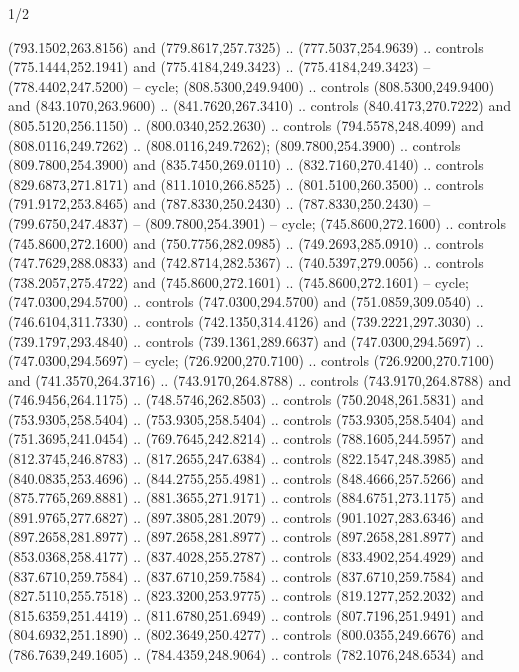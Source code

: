 \begin{flagdescription}{1/2}
\begin{scope}[xshift=0.5\flaglength,yshift=0.5\flagwidth,scale=\flagwidth/759]
\begin{scope}[y=0.8pt, x=0.8pt, yscale=-1,shift={(-720,-480)}]
\begin{scope}[draw=black,fill=c452c25,line width=0.438\lw]
  (793.1502,263.8156) and (779.8617,257.7325) .. (777.5037,254.9639) .. controls
  (775.1444,252.1941) and (775.4184,249.3423) .. (775.4184,249.3423) --
  (778.4402,247.5200) -- cycle;
 (808.5300,249.9400) .. controls (808.5300,249.9400) and
  (843.1070,263.9600) .. (841.7620,267.3410) .. controls (840.4173,270.7222) and
  (805.5120,256.1150) .. (800.0340,252.2630) .. controls (794.5578,248.4099) and
  (808.0116,249.7262) .. (808.0116,249.7262);
 (809.7800,254.3900) .. controls (809.7800,254.3900) and
  (835.7450,269.0110) .. (832.7160,270.4140) .. controls (829.6873,271.8171) and
  (811.1010,266.8525) .. (801.5100,260.3500) .. controls (791.9172,253.8465) and
  (787.8330,250.2430) .. (787.8330,250.2430) -- (799.6750,247.4837) --
  (809.7800,254.3901) -- cycle;
 (745.8600,272.1600) .. controls (745.8600,272.1600) and
  (750.7756,282.0985) .. (749.2693,285.0910) .. controls (747.7629,288.0833) and
  (742.8714,282.5367) .. (740.5397,279.0056) .. controls (738.2057,275.4722) and
  (745.8600,272.1601) .. (745.8600,272.1601) -- cycle;
 (747.0300,294.5700) .. controls (747.0300,294.5700) and
  (751.0859,309.0540) .. (746.6104,311.7330) .. controls (742.1350,314.4126) and
  (739.2221,297.3030) .. (739.1797,293.4840) .. controls (739.1361,289.6637) and
  (747.0300,294.5697) .. (747.0300,294.5697) -- cycle;
 (726.9200,270.7100) .. controls (726.9200,270.7100) and
  (741.3570,264.3716) .. (743.9170,264.8788) .. controls (743.9170,264.8788) and
  (746.9456,264.1175) .. (748.5746,262.8503) .. controls (750.2048,261.5831) and
  (753.9305,258.5404) .. (753.9305,258.5404) .. controls (753.9305,258.5404) and
  (751.3695,241.0454) .. (769.7645,242.8214) .. controls (788.1605,244.5957) and
  (812.3745,246.8783) .. (817.2655,247.6384) .. controls (822.1547,248.3985) and
  (840.0835,253.4696) .. (844.2755,255.4981) .. controls (848.4666,257.5266) and
  (875.7765,269.8881) .. (881.3655,271.9171) .. controls (884.6751,273.1175) and
  (891.9765,277.6827) .. (897.3805,281.2079) .. controls (901.1027,283.6346) and
  (897.2658,281.8977) .. (897.2658,281.8977) .. controls (897.2658,281.8977) and
  (853.0368,258.4177) .. (837.4028,255.2787) .. controls (833.4902,254.4929) and
  (837.6710,259.7584) .. (837.6710,259.7584) .. controls (837.6710,259.7584) and
  (827.5110,255.7518) .. (823.3200,253.9775) .. controls (819.1277,252.2032) and
  (815.6359,251.4419) .. (811.6780,251.6949) .. controls (807.7196,251.9491) and
  (804.6932,251.1890) .. (802.3649,250.4277) .. controls (800.0355,249.6676) and
  (786.7639,249.1605) .. (784.4359,248.9064) .. controls (782.1076,248.6534) and

\end{scope}
\end{scope}
\end{scope}
\end{flagdescription}
